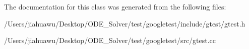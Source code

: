 The documentation for this class was generated from the following files\+:\begin{DoxyCompactItemize}
\item 
/\+Users/jiahuawu/\+Desktop/\+O\+D\+E\+\_\+\+Solver/test/googletest/include/gtest/gtest.\+h\item 
/\+Users/jiahuawu/\+Desktop/\+O\+D\+E\+\_\+\+Solver/test/googletest/src/gtest.\+cc\end{DoxyCompactItemize}
